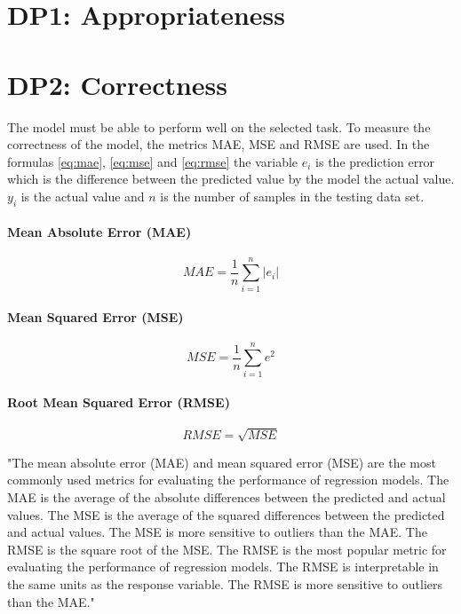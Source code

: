 \section{DP1: Appropriateness}


\section{DP2: Correctness}
The model must be able to perform well on the selected task. 
To measure the correctness of the model, the metrics MAE, MSE and RMSE are used.
In the formulas \ref{eq:mae}, \ref{eq:mse} and \ref{eq:rmse} the variable $e_i$ is the prediction error which is the difference between the predicted value by the model the actual value. 
$y_i$ is the actual value and $n$ is the number of samples in the testing data set.

\paragraph*{Mean Absolute Error (MAE)}

\begin{equation}
    \label{eq:mae}
    MAE = \frac{1}{n} \sum_{i=1}^{n} |e_i|
\end{equation}

\paragraph*{Mean Squared Error (MSE)}

\begin{equation}
    \label{eq:mse}
    MSE = \frac{1}{n} \sum_{i=1}^{n} e^2
\end{equation}

\paragraph*{Root Mean Squared Error (RMSE)}

\begin{equation}
    \label{eq:rmse}
    RMSE = \sqrt{MSE}
\end{equation}

"The mean absolute error (MAE) and mean squared error (MSE) are the most commonly used metrics for
evaluating the performance of regression models. The MAE is the average of the absolute differences between
the predicted and actual values. The MSE is the average of the squared differences between the predicted and
actual values. The MSE is more sensitive to outliers than the MAE. The RMSE is the square root of the MSE.
The RMSE is the most popular metric for evaluating the performance of regression models. The RMSE is
interpretable in the same units as the response variable. The RMSE is more sensitive to outliers than the MAE." 


